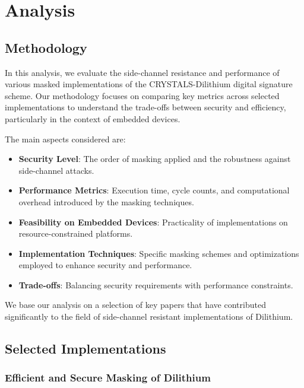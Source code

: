 
\chapter{Analysis}
\thispagestyle{chapterstart}

\section{Methodology}

In this analysis, we evaluate the side-channel resistance and performance of various masked implementations of the CRYSTALS-Dilithium digital signature scheme. Our methodology focuses on comparing key metrics across selected implementations to understand the trade-offs between security and efficiency, particularly in the context of embedded devices.

The main aspects considered are:

\begin{itemize}
    \item \textbf{Security Level}: The order of masking applied and the robustness against side-channel attacks.
    \item \textbf{Performance Metrics}: Execution time, cycle counts, and computational overhead introduced by the masking techniques.
    \item \textbf{Feasibility on Embedded Devices}: Practicality of implementations on resource-constrained platforms.
    \item \textbf{Implementation Techniques}: Specific masking schemes and optimizations employed to enhance security and performance.
    \item \textbf{Trade-offs}: Balancing security requirements with performance constraints.
\end{itemize}

We base our analysis on a selection of key papers that have contributed significantly to the field of side-channel resistant implementations of Dilithium.

\section{Selected Implementations}

\subsection{Efficient and Secure Masking of Dilithium}

